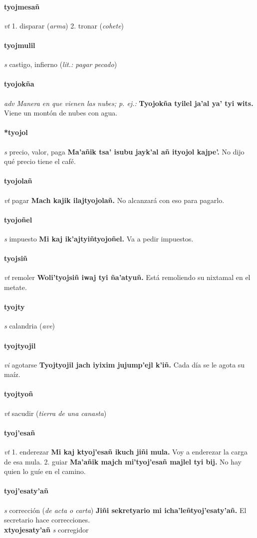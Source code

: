 \documentclass{scrbook}
\newcommand{\entry}[1]{\paragraph{#1}}
\newcommand{\onedefinition}[1]{#1.}
\newcommand{\nontranslationdef}[1]{\textit{#1}}
\newcommand{\partofspeech}[1]{\textit{#1}}
\newcommand{\spanishtranslation}[1]{#1}
\newcommand{\clarification}[1]{(\textit{#1})}
\newcommand{\cholexample}[1]{\textbf{#1}}
\newcommand{\exampletranslation}[1]{#1}
\newcommand{\secondaryentry}[1]{\\\textbf{#1}}
\newcommand{\secondpartofspeech}[1]{\textit{#1}}
\begin{document}
\begin{multicols}{2}
\entry{tyojmesañ}
\partofspeech{vt}
\onedefinition{1}
\spanishtranslation{disparar}
\clarification{arma}
\onedefinition{2}
\spanishtranslation{tronar}
\clarification{cohete}

\entry{tyojmulil}
\partofspeech{s}
\spanishtranslation{castigo, infierno}
\clarification{lit.: pagar pecado}

\entry{tyojokña}
\partofspeech{adv}
\nontranslationdef{Manera en que vienen las nubes; p. ej.:}
\cholexample{Tyojokña tyilel ja'al ya' tyi wits.}
\exampletranslation{Viene un montón de nubes con agua.}

\entry{*tyojol}
\partofspeech{s}
\spanishtranslation{precio, valor, paga}
\cholexample{Ma'añik tsa' isubu jayk'al añ ityojol kajpe'.}
\exampletranslation{No dijo qué precio tiene el café.}

\entry{tyojolañ}
\partofspeech{vt}
\spanishtranslation{pagar}
\cholexample{Mach kajik ilajtyojolañ.}
\exampletranslation{No alcanzará con eso para pagarlo.}

\entry{tyojoñel}
\partofspeech{s}
\spanishtranslation{impuesto}
\cholexample{Mi kaj ik'ajtyiñtyojoñel.}
\exampletranslation{Va a pedir impuestos.}

\entry{tyojsiñ}
\partofspeech{vt}
\spanishtranslation{remoler}
\cholexample{Woli'tyojsiñ iwaj tyi ña'atyuñ.}
\exampletranslation{Está remoliendo su nixtamal en el metate.}

\entry{tyojty}
\partofspeech{s}
\spanishtranslation{calandria}
\clarification{ave}

\entry{tyojtyojil}
\partofspeech{vi}
\spanishtranslation{agotarse}
\cholexample{Tyojtyojil jach iyixim jujump'ejl k'iñ.}
\exampletranslation{Cada día se le agota su maíz.}

\entry{tyojtyoñ}
\partofspeech{vt}
\spanishtranslation{sacudir}
\clarification{tierra de una canasta}

\entry{tyoj'esañ}
\partofspeech{vt}
\onedefinition{1}
\spanishtranslation{enderezar}
\cholexample{Mi kaj ktyoj'esañ ikuch jiñi mula.}
\exampletranslation{Voy a enderezar la carga de esa mula.}
\onedefinition{2}
\spanishtranslation{guiar}
\cholexample{Ma'añik majch mi'tyoj'esañ majlel tyi bij.}
\exampletranslation{No hay quien lo guíe en el camino.}

\entry{tyoj'esaty'añ}
\partofspeech{s}
\spanishtranslation{corrección}
\clarification{de acta o carta}
\cholexample{Jiñi sekretyario mi icha'leñtyoj'esaty'añ.}
\exampletranslation{El secretario hace correcciones.}
\secondaryentry{xtyojesaty'añ}
\secondpartofspeech{s}
\spanishtranslation{corregidor}


\end{multicols}
\end{document}
